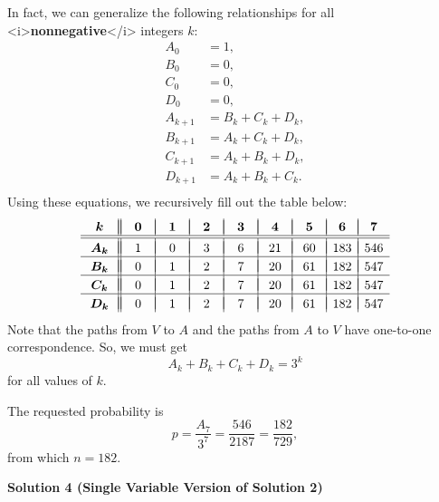 \begin{enumerate}
 In fact, we can generalize the following relationships for all <i>\textbf{nonnegative}</i> integers $k:$
 \begin{align*} A_0&=1, \\ B_0&=0, \\ C_0&=0, \\ D_0&=0, \\ A_{k+1}&=B_k+C_k+D_k, \\ B_{k+1}&=A_k+C_k+D_k, \\ C_{k+1}&=A_k+B_k+D_k, \\ D_{k+1}&=A_k+B_k+C_k. \\ \end{align*}
Using these equations, we recursively fill out the table below:
 \[\begin{array}{c||c|c|c|c|c|c|c|c}    \hspace{7mm}&\hspace{6mm}&\hspace{6mm}&\hspace{6mm}&\hspace{6mm}&\hspace{6mm}&\hspace{6mm}&& \\ [-2.5ex] \boldsymbol{k} & \boldsymbol{0} & \boldsymbol{1} & \boldsymbol{2} & \boldsymbol{3} & \boldsymbol{4} & \boldsymbol{5} & \boldsymbol{6} & \boldsymbol{7} \\  \hline \hline &&&&&&&& \\ [-2.25ex] \boldsymbol{A_k} &1&0&3&6&21&60&183&546 \\ \hline   &&&&&&&& \\ [-2.25ex] \boldsymbol{B_k} &0&1&2&7&20&61&182&547 \\ \hline  &&&&&&&& \\ [-2.25ex] \boldsymbol{C_k} &0&1&2&7&20&61&182&547 \\ \hline    &&&&&&&& \\ [-2.25ex] \boldsymbol{D_k} &0&1&2&7&20&61&182&547 \\ \end{array}\]Note that the paths from $V$ to $A$ and the paths from $A$ to $V$ have one-to-one correspondence. So, we must get 
 \[A_k+B_k+C_k+D_k=3^k\] for all values of $k.$

 The requested probability is 
 \[p=\frac{A_7}{3^7}=\frac{546}{2187}=\frac{182}{729},\] from which $n=\boxed{182}.$




\textbf{Solution 4 (Single Variable Version of Solution 2)}


\end{enumerate}
